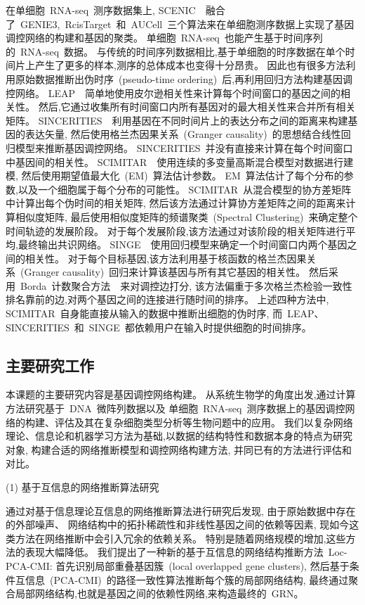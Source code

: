 在单细胞~RNA-seq~测序数据集上, 
SCENIC~\cite{aibar2017scenic}~融合了~GENIE3,~RcisTarget~和~AUCell~三个算法来在单细胞测序数据上实现了基因调控网络的构建和基因的聚类。
单细胞~RNA-seq~也能产生基于时间序列的~RNA-seq~数据。
与传统的时间序列数据相比,基于单细胞的时序数据在单个时间片上产生了更多的样本,测序的总体成本也变得十分昂贵。
因此也有很多方法利用原始数据推断出伪时序~(pseudo-time ordering)~后,再利用回归方法构建基因调控网络。
LEAP~\cite{specht2017leap}~简单地使用皮尔逊相关性来计算每个时间窗口的基因之间的相关性。 
然后,它通过收集所有时间窗口内所有基因对的最大相关性来合并所有相关矩阵。
SINCERITIES~\cite{papili2017sincerities}~利用基因在不同时间片上的表达分布之间的距离来构建基因的表达矢量,
然后使用格兰杰因果关系~(Granger causality)~的思想结合线性回归模型来推断基因调控网络。
SINCERITIES~并没有直接来计算在每个时间窗口中基因间的相关性。
SCIMITAR~\cite{cordero2017tracing}~使用连续的多变量高斯混合模型对数据进行建模,
然后使用期望值最大化~(EM)~算法估计参数。
EM~算法估计了每个分布的参数,以及一个细胞属于每个分布的可能性。
SCIMITAR~从混合模型的协方差矩阵中计算出每个伪时间的相关矩阵,
然后该方法通过计算协方差矩阵之间的距离来计算相似度矩阵,
最后使用相似度矩阵的频谱聚类~(Spectral Clustering)~来确定整个时间轨迹的发展阶段。
对于每个发展阶段,该方法通过对该阶段的相关矩阵进行平均,最终输出共识网络。
SINGE~\cite{deshpande2019network}~使用回归模型来确定一个时间窗口内两个基因之间的相关性。
对于每个目标基因,该方法利用基于核函数的格兰杰因果关系~(Granger causality)~回归来计算该基因与所有其它基因的相关性。
然后采用~Borda~计数聚合方法~\cite{van2000variants}~来对调控边打分,
该方法偏重于多次格兰杰检验一致性排名靠前的边,对两个基因之间的连接进行随时间的排序。
上述四种方法中, SCIMITAR~自身能直接从输入的数据中推断出细胞的伪时序, 
而~LEAP、SINCERITIES~和~SINGE~都依赖用户在输入时提供细胞的时间排序。

\subsection{主要研究工作}
本课题的主要研究内容是基因调控网络构建。
从系统生物学的角度出发,通过计算方法研究基于~DNA~微阵列数据以及
单细胞~RNA-seq~测序数据上的基因调控网络的构建、评估及其在复杂细胞类型分析等生物问题中的应用。
我们以复杂网络理论、信息论和机器学习方法为基础,以数据的结构特性和数据本身的特点为研究对象,
构建合适的网络推断模型和调控网络构建方法,
并同已有的方法进行评估和对比。

(1) 基于互信息的网络推断算法研究

通过对基于信息理论互信息的网络推断算法进行研究后发现,
由于原始数据中存在的外部噪声、
网络结构中的拓扑稀疏性和非线性基因之间的依赖等因素,
现如今这类方法在网络推断中会引入冗余的依赖关系。
特别是随着网络规模的增加,这些方法的表现大幅降低。
我们提出了一种新的基于互信息的网络结构推断方法~Loc-PCA-CMI:
首先识别局部重叠基因簇~(local overlapped gene clusters),
然后基于条件互信息~(PCA-CMI)~的路径一致性算法推断每个簇的局部网络结构,
最终通过聚合局部网络结构,也就是基因之间的依赖性网络,来构造最终的~GRN。

